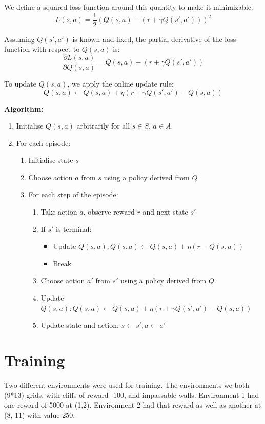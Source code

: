 \documentclass[12pt]{article}
\begin{document}
\begin{multicols}{2}
We define a squared loss function around this quantity to make it minimizable:
\[
L(s,a) = \frac{1}{2}(Q(s,a) - (r + \gamma Q(s', a')))^2
\]

Assuming \( Q(s', a') \) is known and fixed, the partial derivative of the loss function with respect to \( Q(s,a) \) is:
\[
\frac{\partial L(s,a)}{\partial Q(s,a)} = Q(s,a) - (r + \gamma Q(s', a'))
\]

To update \( Q(s,a) \), we apply the online update rule:
\[
Q(s,a) \leftarrow Q(s,a) + \eta (r + \gamma Q(s',a') - Q(s,a))
\]
\end{multicols}

\clearpage
\textbf{Algorithm:}

\large
\begin{enumerate}
    \item Initialise \( Q(s,a) \) arbitrarily for all \( s \in S \), \( a \in A \).
    \item For each episode:
    \begin{enumerate}
        \item Initialise state \( s \)
        \item Choose action \( a \) from \( s \) using a policy derived from \( Q \)
        \item For each step of the episode:
        \begin{enumerate}
            \item Take action \( a \), observe reward \( r \) and next state \( s' \)
            \item If \( s' \) is terminal:
            \begin{itemize}
                \item Update \( Q(s,a): Q(s,a) \leftarrow Q(s,a) + \eta(r - Q(s,a)) \)
                \item Break
            \end{itemize}
            \item Choose action \( a' \) from \( s' \) using a policy derived from \( Q \)
            \item Update \( Q(s,a): Q(s,a) \leftarrow Q(s,a) + \eta (r + \gamma Q(s',a') - Q(s,a)) \)
            \item Update state and action: \( s \leftarrow s', a \leftarrow a' \)
        \end{enumerate}
    \end{enumerate}
\end{enumerate}
\normalsize

\large
\section{Training}
Two different environments were used for training. The environments we both (9*13) grids, with cliffs of reward -100, and impassable walls. Environment 1 had one reward of 5000 at (1,2). Environment 2 had that reward as well as another at (8, 11) with value 250.
\end{document}
